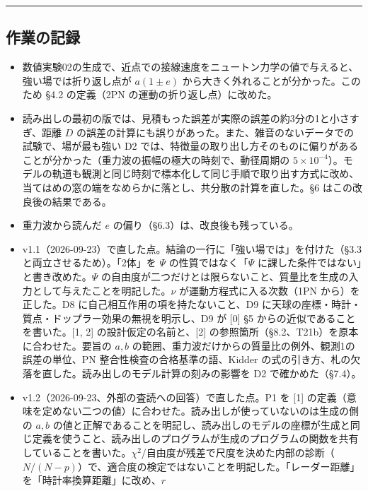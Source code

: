 \documentclass[
  a4paper,
]{ltjsarticle}
\providecommand{\tightlist}{%
  \setlength{\itemsep}{0pt}\setlength{\parskip}{0pt}}
\begin{document}
\begin{center}\rule{0.5\linewidth}{0.5pt}\end{center}

\subsection{作業の記録}\label{ux4f5cux696dux306eux8a18ux9332}

\begin{itemize}
\tightlist
\item
  数値実験02の生成で、近点での接線速度をニュートン力学の値で与えると、強い場では折り返し点が
  \(a(1\pm e)\) から大きく外れることが分かった。このため §4.2
  の定義（2PN の運動の折り返し点）に改めた。
\item
  読み出しの最初の版では、見積もった誤差が実際の誤差の約3分の1と小さすぎ、距離
  \(D\)
  の誤差の計算にも誤りがあった。また、雑音のないデータでの試験で、場が最も強い
  D2
  では、特徴量の取り出し方そのものに偏りがあることが分かった（重力波の振幅の極大の時刻で、動径周期の
  \(5\times10^{-4}\)）。モデルの軌道も観測と同じ時刻で標本化して同じ手順で取り出す方式に改め、当てはめの窓の端をなめらかに落とし、共分散の計算を直した。§6
  はこの改良後の結果である。
\item
  重力波から読んだ \(e\) の偏り（§6.3）は、改良後も残っている。
\item
  v1.1（2026-09-23）で直した点。結論の一行に「強い場では」を付けた（§3.3
  と両立させるため）。「2体」を \(\Psi\) の性質ではなく「\(\Psi\)
  に課した条件ではない」と書き改めた。\(\Psi\)
  の自由度が二つだけとは限らないこと、質量比を生成の入力として与えたことを明記した。\(\nu\)
  が運動方程式に入る次数（1PN から）を正した。D8
  に自己相互作用の項を持たないこと、D9
  に天球の座標・時計・質点・ドップラー効果の無視を明示し、D9 が {[}0{]}
  §5 からの近似であることを書いた。{[}1, 2{]}
  の設計仮定の名前と、{[}2{]}
  の参照箇所（§8.2、T21b）を原本に合わせた。要旨の \(a, b\)
  の範囲、重力波だけからの質量比の例外、観測1の誤差の単位、PN
  整合性検査の合格基準の語、Kidder
  の式の引き方、札の欠落を直した。読み出しのモデル計算の刻みの影響を D2
  で確かめた（§7.4）。
\item
  v1.2（2026-09-23、外部の査読への回答）で直した点。P1 を {[}1{]}
  の定義（意味を定めない二つの値）に合わせた。読み出しが使っていないのは生成の側の
  \(a, b\)
  の値と正解であることを明記し、読み出しのモデルの座標が生成と同じ定義を使うこと、読み出しのプログラムが生成のプログラムの関数を共有していることを書いた。\(\chi^2\)/自由度が残差で尺度を決めた内部の診断（\(N/(N-p)\)）で、適合度の検定ではないことを明記した。「レーダー距離」を「時計率換算距離」に改め、\(r\)

\end{itemize}
\end{document}
